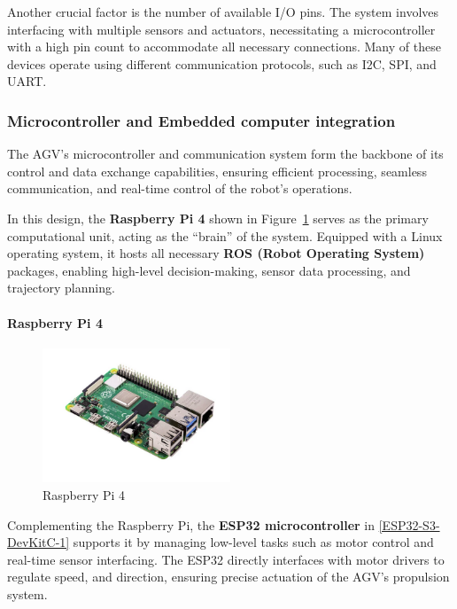 \documentclass[../../main]{subfiles}
\begin{document}
Another crucial factor is the number of available I/O pins. The 
system involves interfacing with multiple sensors and actuators, 
necessitating a microcontroller with a high pin count to 
accommodate all necessary connections. Many of these devices 
operate using different communication protocols, such as I2C, 
SPI, and UART.

\subsubsection{Microcontroller and Embedded computer integration}

The AGV's microcontroller and communication system form the backbone 
of its control and data exchange capabilities, ensuring efficient 
processing, seamless communication, and real-time control of the 
robot's operations. 

In this design, the \textbf{Raspberry Pi 4} shown in Figure~\cref{Raspberry Pi 4} serves as the primary 
computational unit, acting as the ``brain'' of the system. Equipped 
with a Linux operating system, it hosts all necessary 
\textbf{ROS (Robot Operating System)} packages, enabling high-level 
decision-making, sensor data processing, and trajectory planning.


\paragraph{Raspberry Pi 4}

\begin{figure}[H]
    \centering
    \includegraphics[width=0.5\textwidth]{fig/raspberry.png}
    \caption{ Raspberry Pi 4}
    \label{Raspberry Pi 4} %
\end{figure}

Complementing the Raspberry Pi, the \textbf{ESP32 microcontroller} in \cref{ESP32-S3-DevKitC-1} 
supports it by managing low-level tasks 
such as motor control and real-time sensor interfacing. The ESP32 
directly interfaces with motor drivers to regulate speed, 
and direction, ensuring precise actuation of the AGV's propulsion 
system.
\end{document}
